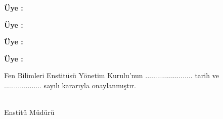 \documentclass[]{esogu}			%
\makeatletter
\newcommand{\AtBeginShipoutClear}{\gdef\AtBegShi@Hook{}}
\makeatother
\begin{document}
\noindent \textbf{Üye :\space}\jiki

\noindent \textbf{Üye :\space}\juc

\noindent \textbf{Üye :\space}\jdort

\noindent \textbf{Üye :\space}\jbes

\vspace{15mm}

\begin{framed}
Fen Bilimleri Enstitüsü Yönetim Kurulu'nun ........................ tarih ve  \space \space \space \space \space\\................... sayılı kararıyla onaylanmıştır. 
\newline
\newline
\begin{flushright}
\mudur \\ Enstitü Müdürü\space \space \space \space \space \space \space \space \space \space \space \space \space \space %
\end{flushright}

\end{framed}


\renewcommand{\listfigurename}{ŞEKİLLER DİZİNİ}
\renewcommand{\listtablename}{ÇİZELGELER DİZİNİ}

\setlength\beforechapskip{-\baselineskip}


\normalsize

\clearpage





\tableofcontents*
\AtBeginShipoutClear
\newpage
{}
\listoffigures
\AtBeginShipoutClear
\newpage
{}
\listoftables
\AtBeginShipoutClear
\clearpage


\clearpage
\printglossary[style=mylong3col, type=\acronymtype, title=Simgeler ve Kısaltmalar Dizini, toctitle=SİMGELER VE KISALTMALAR DİZİNİ]
\clearpage
\end{document}
